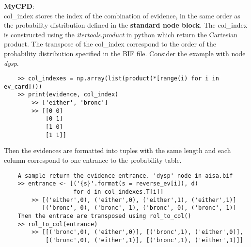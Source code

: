    \noindent \textbf{MyCPD}:\\
    col\_index stores the index of the combination of evidence, in the same order as the probability distribution defined in the \textbf{standard node block}. The col\_index is constructed using the \textit{itertools.product} in python which return the Cartesian product. The transpose of the col\_index correspond to the order of the probability distribution specified in the BIF file. Consider the example with node \textit{dysp}.
    \begin{lstlisting}
    >> col_indexes = np.array(list(product(*[range(i) for i in ev_card])))
    >> print(evidence, col_index) 
        >> ['either', 'bronc']
        >> [[0 0]
            [0 1]
            [1 0]
            [1 1]]
    \end{lstlisting}
   
    \noindent Then the evidences are formatted into tuples with the same length and each column correspond to one entrance to the probability table.\\
    \begin{lstlisting}
    A sample return the evidence entrance. 'dysp' node in aisa.bif
    >> entrance <- [('{s}'.format(s = reverse_ev[i]), d) 
                    for d in col_indexes.T[i]]
        >> [('either',0), ('either',0), ('either',1), ('either',1)]
           [('bronc', 0), ('bronc', 1), ('bronc', 0), ('bronc', 1)]
    Then the entrace are transposed using rol_to_col()
    >> rol_to_col(entrance)
        >> [[('bronc',0), ('either',0)], [('bronc',1), ('either',0)], 
            [('bronc',0), ('either',1)], [('bronc',1), ('either',1)]]
    \end{lstlisting}
    
